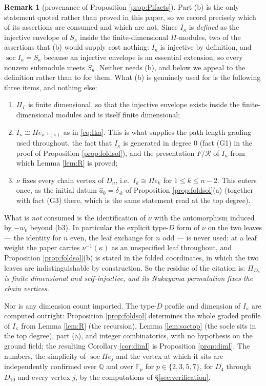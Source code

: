 \documentclass[reqno]{amsart}
\theoremstyle{plain}
\theoremstyle{definition}
\newtheorem{remark}[theorem]{Remark}
\DeclareMathOperator{\soc}{soc}
\newcommand{\ka}{\kappa}
\newcommand{\Pia}{\Pi}
\begin{document}
\begin{remark}[provenance of Proposition \ref{prop:Pifacts}]
Part \textup{(b)} is the only statement quoted rather than proved in this
paper, so we record precisely which of its assertions are consumed and which
are not.  Since $I_\ka$ is \emph{defined} as the injective envelope of
$S_\ka$ inside the finite-dimensional $\Pia$-modules, two of the assertions
that \textup{(b)} would supply cost nothing: $I_\ka$ is injective by
definition, and $\soc I_\ka=S_\ka$ because an injective envelope is an
essential extension, so every nonzero submodule meets $S_\ka$.  Neither
needs \textup{(b)}, and below we appeal to the definition rather than to
\cite{BBK} for them.  What \textup{(b)} is genuinely used for is the
following three items, and nothing else:
\begin{enumerate}\itemsep1pt
\item[\textup{(b1)}] $\Pia_\Gamma$ is finite dimensional, so that the
injective envelope exists inside the finite-dimensional modules and is itself
finite dimensional;
\item[\textup{(b2)}] $I_\ka\cong\Pia e_{\nu^{-1}(\ka)}$ as in \eqref{eq:Ika}.
This is what supplies the path-length grading used throughout, the fact that
$I_\ka$ is generated in degree $0$ \textup{(}fact (G1) in the proof of
Proposition \ref{prop:foldsol}\textup{)}, and the presentation $F/\mathcal{R}$
of $I_\ka$ from which Lemma \ref{lem:R} is proved;
\item[\textup{(b3)}] $\nu$ fixes every chain vertex of $D_n$, i.e.\
$I_k\cong\Pia e_k$ for $1\le k\le n-2$.  This enters once, as the initial
datum $\hat a_0=\delta_{\cdot k}$ of Proposition \ref{prop:foldsol}\textup{(a)}
\textup{(}together with fact (G3) there, which is the same statement read at
the top degree\textup{)}.
\end{enumerate}
What is \emph{not} consumed is the identification of $\nu$ with the
automorphism induced by $-w_0$ beyond \textup{(b3)}.  In particular the
explicit type-$D$ form of $\nu$ on the two leaves --- the identity for $n$
even, the leaf exchange for $n$ odd --- is never used: at a leaf weight the
paper carries $\nu^{-1}(\ka)$ as an unspecified leaf throughout, and
Proposition \ref{prop:foldsol}\textup{(b)} is stated in the folded
coordinates, in which the two leaves are indistinguishable by construction.
So the residue of the citation is: \emph{$\Pia_{D_n}$ is finite dimensional
and self-injective, and its Nakayama permutation fixes the chain vertices.}

Nor is any dimension count imported.  The type-$D$ profile and dimension of
$I_\ka$ are computed outright: Proposition \ref{prop:foldsol} determines the
whole graded profile of $I_\ka$ from Lemma \ref{lem:R} (the recursion),
Lemma \ref{lem:soctop} (the socle sits in the top degree), part
\textup{(a)}, and integer combinatorics, with no hypothesis on the ground
field; the resulting Corollary \ref{cor:dimI} is Proposition
\ref{prop:dimI}.  The numbers, the simplicity of $\soc\Pia e_j$ and the
vertex at which it sits are independently confirmed over $\mathbb{Q}$ and
over $\mathbb{F}_p$ for $p\in\{2,3,5,7\}$, for $D_4$ through $D_{10}$ and
every vertex $j$, by the computations of \S\ref{sec:verification}.
\end{remark}
\end{document}
